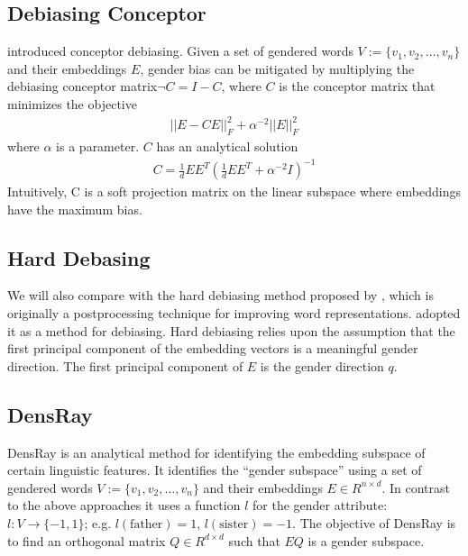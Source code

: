 
\subsection{Debiasing Conceptor}
 introduced conceptor debiasing. Given a set of gendered words $V:=\{v_1,v_2,\dots,v_n\}$ and their embeddings $E$, gender bias can be mitigated by multiplying the debiasing conceptor matrix$\neg C= I-C$, where $C$ is the conceptor matrix that minimizes the objective
\begin{eqnarray}
||E-CE||^2_F+\alpha^{-2}||E||^2_F
\end{eqnarray}
where $\alpha$ is a parameter. $C$ has an analytical solution
\begin{eqnarray}
C=\frac{1}{d}EE^{T}(\frac{1}{d}EE^{T}+\alpha^{-2}I)^{-1}
\end{eqnarray}
Intuitively, C is a soft projection matrix on the linear subspace where embeddings have the maximum bias. 


\subsection{Hard Debasing}
We will also compare with the hard debiasing method proposed
by , which is originally a postprocessing
technique for improving word
representations.  adopted it as a
method for debiasing. Hard debiasing relies upon
the assumption that the first principal component of the
embedding vectors is a meaningful gender direction. The first principal component of $E$ is the gender direction $q$.

\subsection{DensRay}
DensRay \cite{dufter2019analytical} is an analytical method for identifying the
embedding subspace of certain linguistic features. It
identifies the ``gender subspace'' using a set of gendered words
$V:=\{v_1,v_2,\dots,v_n\}$ and their embeddings $E \in
R^{n\times d}$. In contrast to the above approaches it uses a function $l$ for the gender attribute:
$l:V\to \{-1,1\}$;
e.g. $l(\mbox{father})=1$, $l(\mbox{sister})=-1$. The objective of DensRay
is to find an orthogonal matrix $Q\in R^{d\times d}$ such
that $EQ$ is  a gender subspace.

